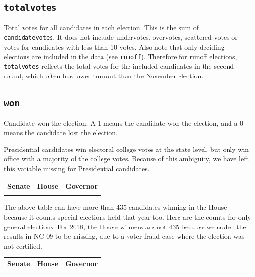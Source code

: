 \documentclass[12pt]{article}
\begin{document}
\begin{table}[!h]
\centering
\footnotesize

\end{table}


\FloatBarrier

\subsection*{\texttt{totalvotes}}

Total votes for all candidates in each election. This is the sum of \texttt{candidatevotes}. It does not include undervotes, overvotes, scattered votes or votes for candidates with less than 10 votes.  Also note that only deciding elections are included in the data (see \texttt{runoff}). Therefore for runoff elections, \texttt{totalvotes} reflects the total votes for the included candidates in the second round, which often has lower turnout than the November election.



\subsection*{\texttt{won}}
Candidate won the election. A 1 means the candidate won the election, and a 0 means the candidate lost the election.

Presidential candidates win electoral college votes at the state level, but only win office with a majority of the college votes. Because of this ambiguity, we have left this variable missing for Presidential candidates.

    \begin{tabularx}{\linewidth}{CCC}
    \textbf{Senate} & \textbf{House} & \textbf{Governor}\\
     &  & 
    \end{tabularx}

The above table can have more than 435 candidates winning in the House because it counts special elections held that year too. Here are the counts for only general elections. For 2018, the House winners are not 435 because we coded the results in NC-09 to be missing, due to a voter fraud case where the election was not certified.

\begin{tabularx}{\linewidth}{CCC}
    \textbf{Senate} & \textbf{House} & \textbf{Governor}\\
     &  & 
    \end{tabularx}
\end{document}
